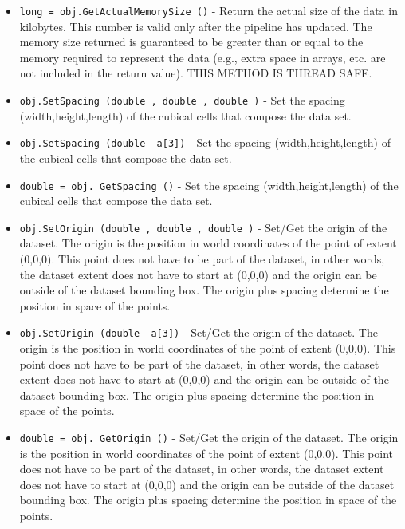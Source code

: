 \begin{itemize}
\item  \verb|long = obj.GetActualMemorySize ()| -  Return the actual size of the data in kilobytes. This number
 is valid only after the pipeline has updated. The memory size
 returned is guaranteed to be greater than or equal to the
 memory required to represent the data (e.g., extra space in
 arrays, etc. are not included in the return value). THIS METHOD
 IS THREAD SAFE.

\item  \verb|obj.SetSpacing (double , double , double )| -  Set the spacing (width,height,length) of the cubical cells that
 compose the data set.

\item  \verb|obj.SetSpacing (double  a[3])| -  Set the spacing (width,height,length) of the cubical cells that
 compose the data set.

\item  \verb|double = obj. GetSpacing ()| -  Set the spacing (width,height,length) of the cubical cells that
 compose the data set.

\item  \verb|obj.SetOrigin (double , double , double )| -  Set/Get the origin of the dataset. The origin is the position in world
 coordinates of the point of extent (0,0,0). This point does not have to be
 part of the dataset, in other words, the dataset extent does not have to
 start at (0,0,0) and the origin can be outside of the dataset bounding
 box.
 The origin plus spacing determine the position in space of the points.

\item  \verb|obj.SetOrigin (double  a[3])| -  Set/Get the origin of the dataset. The origin is the position in world
 coordinates of the point of extent (0,0,0). This point does not have to be
 part of the dataset, in other words, the dataset extent does not have to
 start at (0,0,0) and the origin can be outside of the dataset bounding
 box.
 The origin plus spacing determine the position in space of the points.

\item  \verb|double = obj. GetOrigin ()| -  Set/Get the origin of the dataset. The origin is the position in world
 coordinates of the point of extent (0,0,0). This point does not have to be
 part of the dataset, in other words, the dataset extent does not have to
 start at (0,0,0) and the origin can be outside of the dataset bounding
 box.
 The origin plus spacing determine the position in space of the points.


\end{itemize}
